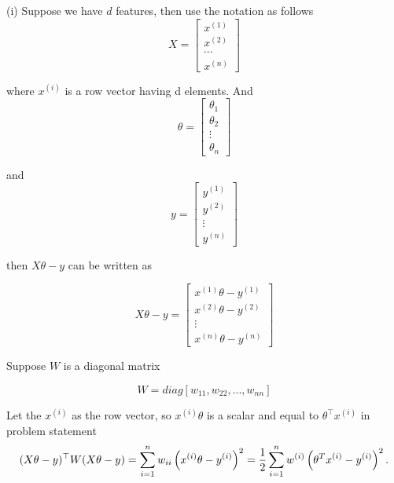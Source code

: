 \begin{answer}

(i) Suppose we have $d$ features, then use the notation as follows
\begin{equation*}
    X = \left[\begin{matrix}
       x^{(1)} \\ x^{(2)} \\ \cdots \\ x^{(n)}
      \end{matrix}
    \right]
  \end{equation*}

where $x^{(i)}$ is a row vector having d elements. And 
\begin{equation*}
\theta = \left[\begin{matrix}
       \theta_1 \\
       \theta_2 \\
       \vdots \\
       \theta_n
      \end{matrix}
    \right]
\end{equation*}

and 
\begin{equation*}
y = \left[\begin{matrix}
       y^{(1)} \\
       y^{(2)} \\
       \vdots \\
       y^{(n)}
      \end{matrix}
    \right]
\end{equation*}

then $X\theta - y$ can be written as 

\begin{equation*}
X\theta - y = \left[\begin{matrix}
       x^{(1)}\theta - y^{(1)} \\
       x^{(2)}\theta - y^{(2)} \\
       \vdots \\
       x^{(n)}\theta - y^{(n)}
      \end{matrix}
    \right]
\end{equation*}

Suppose $W$ is a diagonal matrix

\begin{equation*}
W = diag\left[ w_{11}, w_{22}, ..., w_{nn} \right]
\end{equation*}

Let the $x^{(i)}$ as the row vector, so $x^{(i)}\theta$ is a scalar and equal to $\theta^\top x^{(i)}$ in problem statement
\begin{equation*}
    (X\theta - y)^\top W (X\theta - y) = \sum_{i=1}^{n} w_{ii}\left(x^{(i)}\theta - y^{(i)}\right)^2 = \frac{1}{2} \sum_{i=1}^{n} w^{(i)}
		\left(\theta^Tx^{(i)} - y^{(i)}\right)^2.
\end{equation*}


\end{answer}

